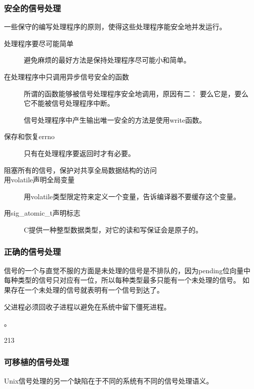 {{        \subsubsection{安全的信号处理}
        {
            一些保守的编写处理程序的原则，使得这些处理程序能安全地并发运行。

            \begin{description}
                \item[处理程序要尽可能简单] 避免麻烦的最好方法是保持处理程序尽可能小和简单。
                \item[在处理程序中只调用异步信号安全的函数]
                {
                    所谓的函数能够被信号处理程序安全地调用，原因有二：
                    要么它是，要么它不能被信号处理程序中断。

                    信号处理程序中产生输出唯一安全的方法是使用write函数。
                }
                \item[保存和恢复errno] 只有在处理程序要返回时才有必要。
                \item[阻塞所有的信号，保护对共享全局数据结构的访问]
                \item[用volatile声明全局变量] 用volatile类型限定符来定义一个变量，告诉编译器不要缓存这个变量。
                \item[用sig\_atomic\_t声明标志] C提供一种整型数据类型，对它的读和写保证会是原子的。
            \end{description}
        }

        \subsubsection{正确的信号处理}
        {
            信号的一个与直觉不服的方面是未处理的信号是不排队的，因为pending位向量中每种类型的信号只对应有一位，所以每种类型最多只能有一个未处理的信号。
            如果存在一个未处理的信号就表明有一个信号到达了。

            父进程必须回收子进程以避免在系统中留下僵死进程。

            。

            \begin{practicec}
                213
            \end{practicec}
        }

        \subsubsection{可移植的信号处理}
        {
            Unix信号处理的另一个缺陷在于不同的系统有不同的信号处理语义。

}}}
